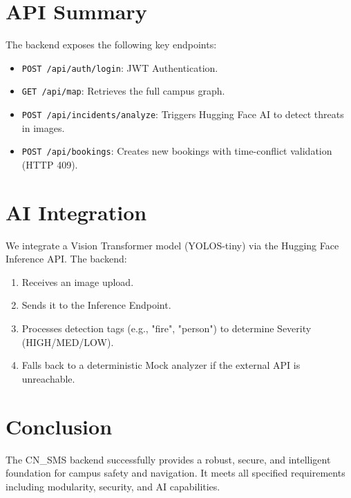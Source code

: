 \documentclass[a4paper,12pt]{article}
\begin{document}
\section{API Summary}
The backend exposes the following key endpoints:
\begin{itemize}
    \item \texttt{POST /api/auth/login}: JWT Authentication.
    \item \texttt{GET /api/map}: Retrieves the full campus graph.
    \item \texttt{POST /api/incidents/analyze}: Triggers Hugging Face AI to detect threats in images.
    \item \texttt{POST /api/bookings}: Creates new bookings with time-conflict validation (HTTP 409).
\end{itemize}

\section{AI Integration}
We integrate a Vision Transformer model (YOLOS-tiny) via the Hugging Face Inference API. The backend:
\begin{enumerate}
    \item Receives an image upload.
    \item Sends it to the Inference Endpoint.
    \item Processes detection tags (e.g., "fire", "person") to determine Severity (HIGH/MED/LOW).
    \item Falls back to a deterministic Mock analyzer if the external API is unreachable.
\end{enumerate}

\section{Conclusion}
The CN\_SMS backend successfully provides a robust, secure, and intelligent foundation for campus safety and navigation. It meets all specified requirements including modularity, security, and AI capabilities.
\end{document}
